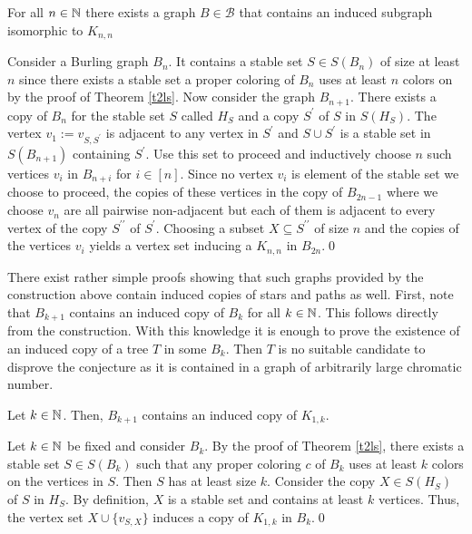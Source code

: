 \begin{lemma}
For all $n\in\mathbb{N}$ there exists a graph $B\in\mathcal{B}$ that contains an induced subgraph isomorphic to $K_{n,n}$
\end{lemma}
\begin{prf}
Consider a Burling graph $B_n$. It contains a stable set $S\in S(B_n)$ of size at least $n$ since there exists a stable set a proper coloring of $B_n$ uses at least $n$ colors on by the proof of Theorem \ref{t2ls}. Now consider the graph $B_{n+1}$. There exists a copy of $B_n$ for the stable set $S$ called $H_S$ and a copy $S^\prime$ of $S$ in $S(H_S)$. The vertex $v_1:=v_{S,S^\prime}$ is adjacent to any vertex in $S^\prime$ and $S\cup S^\prime$ is a stable set in $S(B_{n+1})$ containing $S^\prime$. Use this set to proceed and inductively choose $n$ such vertices $v_i$ in $B_{n+i}$ for $i\in [n]$. Since no vertex $v_i$ is element of the stable set we choose to proceed, the copies of these vertices in the copy of $B_{2n-1}$ where we choose $v_n$ are all pairwise non-adjacent but each of them is adjacent to every vertex of the copy $S^{\prime\prime}$ of $S^\prime$. Choosing a subset $X\subseteq S^{\prime\prime}$ of size $n$ and the copies of the vertices $v_i$ yields a vertex set inducing a $K_{n,n}$ in $B_{2n}$.\qed
\end{prf}

There exist rather simple proofs showing that such graphs provided by the construction above contain induced copies of stars and paths as well.
First, note that $B_{k+1}$ contains an induced copy of $B_k$ for all $k\in\mathbb{N}$. This follows directly from the construction. With this knowledge it is enough to prove the existence of an induced copy of a tree $T$ in some $B_k$. Then $T$ is no suitable candidate to disprove the conjecture as it is contained in a graph of arbitrarily large chromatic number.

\begin{thm}
Let $k\in\mathbb{N}$. Then, $B_{k+1}$ contains an induced copy of $K_{1,k}$.
\end{thm}
\begin{prf}
Let $k\in\mathbb{N}$ be fixed and consider $B_k$. By the proof of Theorem \ref{t2ls}, there exists a stable set $S\in S(B_k)$ such that any proper coloring $c$ of $B_k$ uses at least $k$ colors on the vertices in $S$. Then $S$ has at least size $k$. Consider the copy $X\in S(H_S)$ of $S$ in $H_S$. By definition, $X$ is a stable set and contains at least $k$ vertices. Thus, the vertex set $X\cup \lbrace v_{S,X}\rbrace$ induces a copy of $K_{1,k}$ in $B_k$.\qed   
\end{prf}


